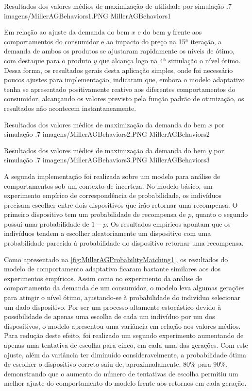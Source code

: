 \figura
	{Resultados dos valores médios de maximização de utilidade por simulação}
	{.7}
	{imagens/MillerAGBehaviors1.PNG}
	{MillerAGBehaviors1}
	{}

Em relação ao ajuste da demanda do bem $x$ e do bem $y$ frente aos comportamentos do consumidor e ao impacto do preço na 15ª iteração, a demanda de ambos os produtos se ajustaram rapidamente os níveis de ótimo, com destaque para o produto $y$ que alcança logo na 4ª simulação o nível ótimo. Dessa forma, os resultados gerais desta aplicação simples, onde foi necessário poucos ajustes para implementação, indicaram que, embora o modelo adaptativo tenha se apresentado positivamente reativo aos diferentes comportamentos do consumidor, alcançando os valores previsto pela função padrão de otimização, os resultados não acontecem instantaneamente.

\figura
	{Resultados dos valores médios de maximização da demanda do bem $x$ por simulação}
	{.7}
	{imagens/MillerAGBehaviors2.PNG}
	{MillerAGBehaviors2}
	{}

\figura
	{Resultados dos valores médios de maximização da demanda do bem $y$ por simulação}
	{.7}
	{imagens/MillerAGBehaviors3.PNG}
	{MillerAGBehaviors3}
	{}

A segunda implementação foi realizada sobre um modelo para análise de comportamentos sob um contexto de incerteza. No modelo básico, um experimento empírico de correspondência de probabilidade, os indivíduos precisam escolher entre dois dispositivos que irão retornar uma recompensa. O primeiro dispositivo tem um probabilidade de recompensa de $p$, quanto o segundo possui uma probabilidade de $1-p$. Os resultados empíricos apontam que os indivíduos tendem a escolher aleatoriamente um dispositivo com uma probabilidade parecida à probabilidade do dispositivo retornar uma recompensa.

Como apresentado na \autoref{fig:MillerAGProbabilityMatching1}, os resultados do modelo de comportamento adaptativo ficaram bastante similares aos dos experimentos empíricos. Assim como no experimento da análise de comportamento da demanda de um consumidor, o modelo leva algumas gerações para atingir o nível ótimo, ajustando-se à probabilidade do indivíduo selecionar um dado dispositivo. Por ser um processo altamente estocástico devido à possibilidade de apenas uma escolha de cada um indivíduo por um dos dispositivos, o modelo apresentou uma variância em relação aos valores médios. Para redução deste efeito, foi realizado um segundo experimento aumentando de apenas uma tentativa de escolha para cinco, em cada uma das gerações. Com este ajuste, além da variância ter diminuído consideravelmente, a probabilidade ótima de escolher o dispositivo correto saiu de, aproximadamente, 80\% para 90\%, demonstrando que o aumento do número de tentativas de escolha permitiu um melhor ajuste do comportamento do modelo frente aos retornos em cada geração. 

